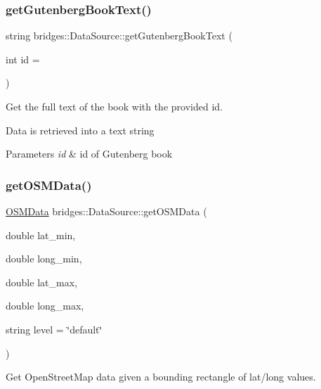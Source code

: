 \subsubsection{\texorpdfstring{get\+Gutenberg\+Book\+Text()}{getGutenbergBookText()}}
{\footnotesize\ttfamily string bridges\+::\+Data\+Source\+::get\+Gutenberg\+Book\+Text (\begin{DoxyParamCaption}\item[{int}]{id = {} }\end{DoxyParamCaption})\hspace{0.3cm}{\ttfamily [inline]}}



Get the full text of the book with the provided id. 

Data is retrieved into a text string


\begin{DoxyParams}{Parameters}
{\em id} & id of Gutenberg book \\
\hline
\end{DoxyParams}
\mbox{\label{classbridges_1_1_data_source_a57736934a90bdb86948a7c338ec81a2d}} 
\subsubsection{\texorpdfstring{get\+O\+S\+M\+Data()}{getOSMData()}\hspace{0.1cm}{\footnotesize\ttfamily [1/2]}}
{\footnotesize\ttfamily \hyperlink{classbridges_1_1dataset_1_1_o_s_m_data}{O\+S\+M\+Data} bridges\+::\+Data\+Source\+::get\+O\+S\+M\+Data (\begin{DoxyParamCaption}\item[{double}]{lat\+\_\+min,  }\item[{double}]{long\+\_\+min,  }\item[{double}]{lat\+\_\+max,  }\item[{double}]{long\+\_\+max,  }\item[{string}]{level = {\ttfamily \char`\"{}default\char`\"{}} }\end{DoxyParamCaption})\hspace{0.3cm}{\ttfamily [inline]}}



Get Open\+Street\+Map data given a bounding rectangle of lat/long values. 



